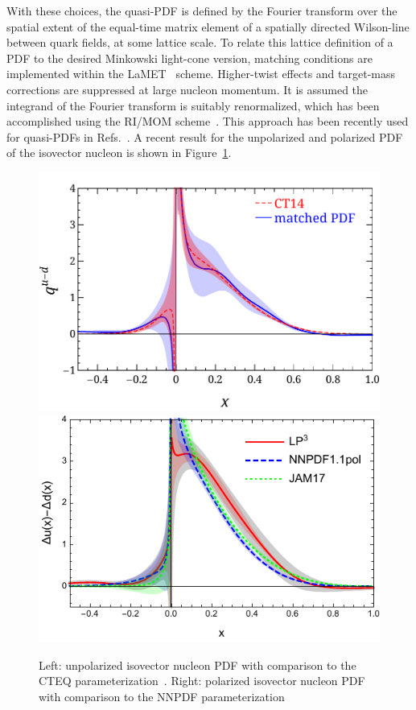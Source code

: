 With these choices, the quasi-PDF is defined by the Fourier transform over the spatial extent of the equal-time matrix element of a spatially directed Wilson-line between quark fields, at some lattice scale. To relate this lattice definition of a PDF to the desired Minkowski light-cone version, matching conditions are implemented within the LaMET~\cite{Ji:2013dva,Ji:2014gla} scheme. Higher-twist effects and target-mass corrections are suppressed at large nucleon momentum. It is assumed the integrand of the Fourier transform is suitably renormalized, which has been accomplished using the RI/MOM scheme~\cite{Martinelli:1994ty}. This approach has been recently used  for quasi-PDFs  in Refs.~\cite{Alexandrou:2017huk,Chen:2017mzz,Green:2017xeu,Chen:2018xof,Lin:2018qky}. A recent result for the unpolarized and polarized PDF of the isovector nucleon is shown in Figure~\ref{fig_quasipdf}.

\begin{figure}[h!]
	\centering
	\includegraphics[width=0.45\columnwidth]{figures/LP3-PDF-CT14}\hspace{1cm}
	\includegraphics[width=0.45\columnwidth]{figures/a09m130-helicity-comp}
	\caption{Left: unpolarized isovector nucleon PDF with comparison to the CTEQ parameterization~\cite{Chen:2018xof}.
		Right: polarized isovector nucleon PDF with comparison to the NNPDF parameterization~\cite{Lin:2018qky}}
	\label{fig_quasipdf}
\end{figure}

